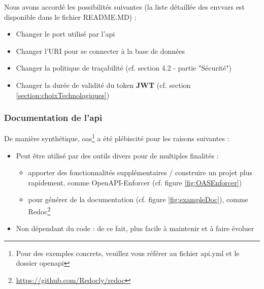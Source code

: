 Nous avons accordé les possibilités suivantes (la liste détaillée des \glspl{envvar} est disponible dans le fichier README.MD) :

\begin{itemize}
    \item Changer le port utilisé par l'\Gls{api}
    \item Changer l'URI pour se connecter à la base de données
    \item Changer la politique de traçabilité (cf. section 4.2 - partie "Sécurité")
    \item Changer la durée de validité du token \textbf{JWT} (cf. section \ref{section:choixTechnologiques})
\end{itemize}

\subsubsection{Documentation de l'\Gls{api}}

De manière synthétique, \Gls{oas}\footnote{
    Pour des exemples concrets, veuillez vous référer au fichier api.yml et le dossier openapi
} a été plébiscité pour les raisons suivantes :

\begin{itemize}
    \item Peut être utilisé par des outils divers pour de multiples finalités :
    \begin{itemize}[nosep,noitemsep,topsep=0pt,partopsep=0pt,after=\vspace*{2pt}]
        \item apporter des fonctionnalités supplémentaires / construire un projet plus rapidement, comme OpenAPI-Enforcer (cf. figure \ref{fig:OASEnforcer})
        \item pour générer de la documentation (cf. figure \ref{fig:exampleDoc}), comme Redoc\footnote{
            \url{https://github.com/Redocly/redoc}
        }
    \end{itemize}
    \item Non dépendant du code : de ce fait, plus facile à maintenir et à faire évoluer
\end{itemize}

